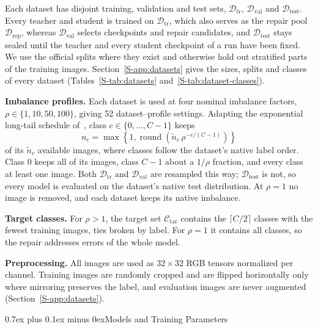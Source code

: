 \documentclass[10pt,journal,compsoc]{IEEEtran}
\makeatletter
\def\subsection{\@startsection{subsection}{2}{\z@}{-3.5ex plus -0.5ex minus -1.5ex}%
{0.7ex plus 0.1ex minus 0ex}{\normalfont\normalsize\sffamily\bfseries}}
\theoremstyle{definition}
\makeatother
\begin{document}
Each dataset has disjoint training, validation and test sets,
$\mathcal{D}_{\mathrm{tr}}$, $\mathcal{D}_{\mathrm{val}}$ and
$\mathcal{D}_{\mathrm{test}}$. Every teacher and student is trained on
$\mathcal{D}_{\mathrm{tr}}$, which also serves as the repair pool
$\mathcal{D}_{\mathrm{rep}}$, whereas $\mathcal{D}_{\mathrm{val}}$ selects
checkpoints and repair candidates, and $\mathcal{D}_{\mathrm{test}}$
stays sealed until the teacher and every student checkpoint of a run
have been fixed. We use the official splits where they exist and
otherwise hold out stratified parts of the training images.
Section~\ref{S-app:datasets} gives the sizes, splits and classes of every
dataset (Tables~\ref{S-tab:datasets} and~\ref{S-tab:dataset-classes}).

\textbf{Imbalance profiles.} Each dataset is used at four nominal
imbalance factors, $\rho\in\{1,10,50,100\}$, giving 52 dataset--profile
settings. Adapting the exponential long-tail schedule
of~\cite{cui2019class}, class $c\in\{0,\ldots,C-1\}$ keeps
\begin{equation}
\label{eq:imbalance-profile}
n_c=\max\!\left\{1,\operatorname{round}\!\left(\widetilde n_c\,\rho^{-c/(C-1)}\right)\right\}
\end{equation}
of its $\widetilde n_c$ available images, where classes follow the
dataset's native label order. Class $0$ keeps all of its images, class
$C-1$ about a $1/\rho$ fraction, and every class at least one image. Both $\mathcal{D}_{\mathrm{tr}}$ and
$\mathcal{D}_{\mathrm{val}}$ are resampled this way;
$\mathcal{D}_{\mathrm{test}}$ is not, so every model is evaluated on the
dataset's native test distribution. At $\rho=1$ no image is removed, and
each dataset keeps its native imbalance.

\textbf{Target classes.} For $\rho>1$, the target set
$\mathcal{C}_{\mathrm{tar}}$ contains the $\lceil C/2\rceil$ classes with
the fewest training images, ties broken by label. For $\rho=1$ it contains
all classes, so the repair addresses errors of the whole model.

\textbf{Preprocessing.} All images are used as $32\times32$ RGB tensors
normalized per channel. Training images are randomly cropped and are
flipped horizontally only where mirroring preserves the label, and
evaluation images are never augmented (Section~\ref{S-app:datasets}).

\vspace{-5pt}
\subsection{Models and Training Parameters}
\label{sec:training-parameters}
\end{document}
